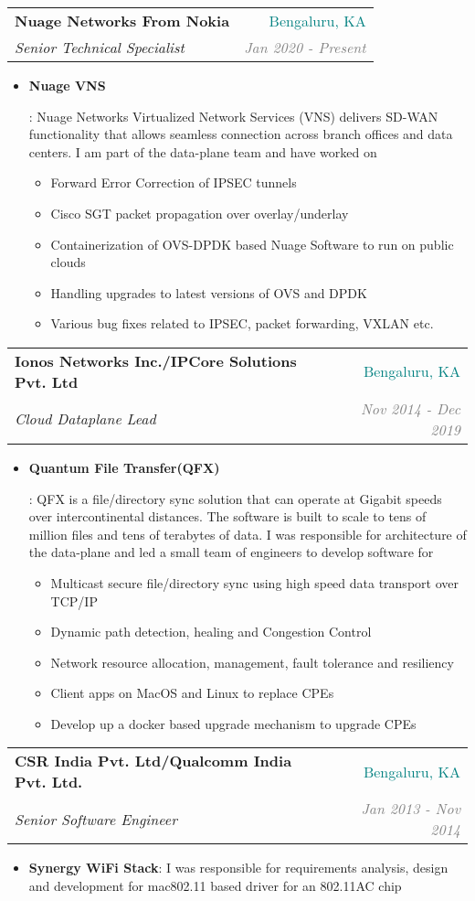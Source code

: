 \documentclass[letterpaper,11pt]{article}
\makeatletter
\newcommand{\resumeItem}[2]{
  \item\small{
    \textbf{#1}{: #2 \vspace{-2pt}}
  }
}
\newcommand{\resumeSubheading}[4]{
  \vspace{-1pt}\item
    \begin{tabular*}{0.97\textwidth}[t]{l@{\extracolsep{\fill}}r}
      \textbf{#1} & #2 \\
      \textit{\small#3} & \textit{\small #4} \\
    \end{tabular*}\vspace{-5pt}
}
\newcommand{\resumeItemListStart}{\begin{itemize}}
\newcommand{\resumeItemListEnd}{\end{itemize}\vspace{-5pt}}
\makeatother
\begin{document}
       \resumeSubheading
      {Nuage Networks From Nokia}{\textcolor{teal}{Bengaluru, KA}}
      {Senior Technical Specialist}{\textcolor{GRAY}{Jan 2020 - Present}}
      \resumeItemListStart
        \resumeItem{Nuage VNS}
          {
           Nuage Networks Virtualized Network Services (VNS) delivers SD-WAN functionality that allows seamless connection across branch offices and data centers. I am part of the data-plane team and have worked on
           \begin{itemize}
           \item {Forward Error Correction of IPSEC tunnels}
           \item {Cisco SGT packet propagation over overlay/underlay}
           \item {Containerization of OVS-DPDK based Nuage Software to run on public clouds}
           \item {Handling upgrades to latest versions of OVS and DPDK}
           \item {Various bug fixes related to IPSEC, packet forwarding, VXLAN etc.}
           \end{itemize}}
      \resumeItemListEnd
    \resumeSubheading
      {Ionos Networks Inc./IPCore Solutions Pvt. Ltd}{\textcolor{teal}{Bengaluru, KA}}
      {Cloud Dataplane Lead}{\textcolor{GRAY}{Nov 2014 - Dec 2019}}
      \resumeItemListStart
        \resumeItem{Quantum File Transfer(QFX)}
          {
           QFX is a file/directory sync solution that can operate at Gigabit speeds over intercontinental distances. The software is built to scale to tens of  million files and tens of  terabytes of data. I was responsible for architecture of the data-plane and led a small team of engineers to develop software for
           
           \begin{itemize}
           \item {Multicast secure file/directory sync using high speed data transport over TCP/IP}
           \item {Dynamic path detection, healing and Congestion Control}
           \item {Network resource allocation, management, fault tolerance and resiliency}
           \item {Client apps on MacOS and Linux to replace CPEs}
           \item {Develop up a docker based upgrade mechanism to upgrade CPEs}
           \end{itemize}}
      \resumeItemListEnd
      \resumeSubheading
      {CSR India Pvt. Ltd/Qualcomm India Pvt. Ltd.}{\textcolor{teal}{Bengaluru, KA}}
      {Senior Software Engineer}{\textcolor{GRAY}{Jan 2013 - Nov 2014}}
      \resumeItemListStart
        \resumeItem{Synergy WiFi Stack}
        {I was responsible for requirements analysis, design and development for mac802.11 based driver for an 802.11AC chip}
      \resumeItemListEnd
\end{document}

